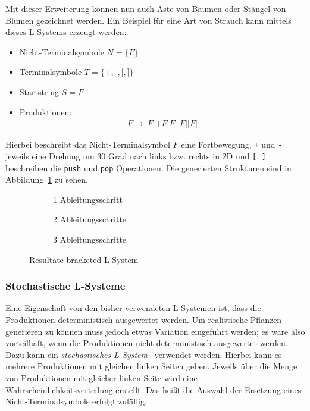 Mit dieser Erweiterung können nun auch Äste von Bäumen oder Stängel von Blumen gezeichnet werden.
Ein Beispiel für eine Art von Strauch kann mittels dieses L-Systems erzeugt werden:
\begin{itemize}
    \item Nicht-Terminalsymbole $N=\{F\}$
    \item Terminalsymbole $T=\{\texttt{+},\texttt{-},\texttt{[},\texttt{]}\}$
    \item Startstring $S=F$
    \item Produktionen:
    \begin{align*}
        F\rightarrow~F\texttt{[+}F\texttt{]}F\texttt{[-}F\texttt{]}\texttt{[}F\texttt{]}
    \end{align*}
\end{itemize}

Hierbei beschreibt das Nicht-Terminalsymbol $F$ eine Fortbewegung, \texttt{+} und \texttt{-} jeweils eine Drehung um 30 Grad nach links bzw. rechts in 2D und \texttt{[}, \texttt{]} beschreiben die \texttt{push} und \texttt{pop} Operationen.
Die generierten Strukturen sind in Abbildung~\ref{fig:Bracketed} zu sehen.

\begin{figure}[ht]
    \begin{subfigure}[t]{.3\textwidth}
        \centering
        
        \caption*{1 Ableitungsschritt}
    \end{subfigure}
    \hfill
    \begin{subfigure}[t]{.3\textwidth}
        \centering
        
        \caption*{2 Ableitungsschritte}
    \end{subfigure}
    \hfill
    \begin{subfigure}[t]{.3\textwidth}
        \centering
        
        \caption*{3 Ableitungsschritte}
    \end{subfigure}
    \caption{Resultate bracketed L-System}\label{fig:Bracketed}
\end{figure}


\subsubsection{Stochastische L-Systeme}
Eine Eigenschaft von den bisher verwendeten L-Systemen ist, dass die Produktionen deterministisch ausgewertet werden.
Um realistische Pflanzen generieren zu können muss jedoch etwas Variation eingeführt werden; es wäre also vorteilhaft, wenn die Produktionen nicht-deterministisch ausgewertet werden.
Dazu kann ein \emph{stochastisches L-System}~\cite*{Shaker2016} verwendet werden.
Hierbei kann es mehrere Produktionen mit gleichen linken Seiten geben.
Jeweils über die Menge von Produktionen mit gleicher linken Seite wird eine Wahrscheinlichkeitsverteilung erstellt.
Das heißt die Auswahl der Ersetzung eines Nicht-Terminalsymbols erfolgt zufällig.

